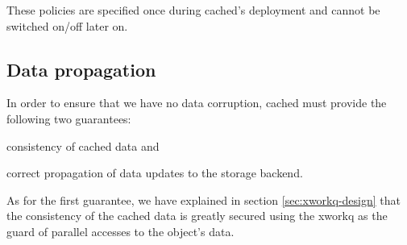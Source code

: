 These policies are specified once during cached's deployment and cannot be 
switched on/off later on.

\subsection{Data propagation}

In order to ensure that we have no data corruption, cached must provide the 
following two guarantees:
\begin{inparaenum}[i)]
\item consistency of cached data and
\item correct propagation of data updates to the storage backend.
\end{inparaenum}

\begin{comment}
Cache coherence is a concept that is closely connected with concurrency 
control, as is evident in Figure \ref{fig:cached-design.pdf}. It is commonly 
used as a term in the literature on the subject of caches for multiprocessor 
systems or distributed caches and it refers to:

\begin{enumerate}
	\item the consistency of data that are stored in the cache and
	\item how each change is propagated through the system, to the other 
		storage tiers.\label{list:second-coherence}
\end{enumerate}

If we wanted to rephrase the above to match our case, we could say that it 
refers to the consistency of the data that are stored in cached and how each 
change is propagated to the blocker.
\end{comment}

As for the first guarantee, we have explained in section 
\ref{sec:xworkq-design} that the consistency of the cached data is greatly 
secured using the xworkq as the guard of parallel accesses to the object's 
data.

\begin{comment}
The problem is evident if you consider the eviction of an object with dirty 
data. xcache does not operate on object level and thus is unaware of the 
contents of the cache entry. Thus, cached must use the cache entry finalization 
hook to increment the refcount of the object so that it can not be removed 
until all data have been flushed to the blocker. Essentially, cached overrides 
the xcache's book-keeping to maintain cache coherency.
\end{comment}

